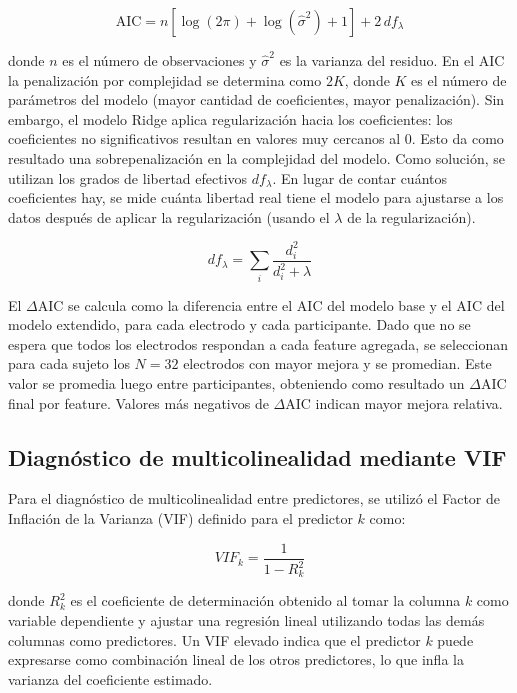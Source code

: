 \begin{equation}
    \label{eq:aic}
    \mathrm{AIC} = n\left[\log(2\pi) + \log(\hat{\sigma}^2) + 1\right] + 2\,df_\lambda
\end{equation}

donde $n$ es el número de observaciones y $\hat{\sigma}^2$ es la varianza del residuo. En el AIC la penalización por complejidad se determina como $2K$, donde $K$ es el número de parámetros del modelo (mayor cantidad de coeficientes, mayor penalización). Sin embargo, el modelo Ridge aplica regularización hacia los coeficientes: los coeficientes no significativos resultan en valores muy cercanos al 0. Esto da como resultado una sobrepenalización en la complejidad del modelo. Como solución, se utilizan los grados de libertad efectivos $df_{\lambda}$. En lugar de contar cuántos coeficientes hay, se mide cuánta libertad real tiene el modelo para ajustarse a los datos después de aplicar la regularización (usando el $\lambda$ de la regularización).

\begin{equation}
    \label{eq:df_lambda}
    df_{\lambda} = \sum_{i} \frac{d_i^2}{d_i^2 + \lambda}
\end{equation}

El $\Delta\mathrm{AIC}$ se calcula como la diferencia entre el AIC del modelo base y el AIC del modelo extendido, para cada electrodo y cada participante. Dado que no se espera que todos los electrodos respondan a cada feature agregada, se seleccionan para cada sujeto los $N = 32$ electrodos con mayor mejora y se promedian. Este valor se promedia luego entre participantes, obteniendo como resultado un $\Delta\mathrm{AIC}$ final por feature. Valores más negativos de $\Delta\mathrm{AIC}$ indican mayor mejora relativa.

\subsection{Diagnóstico de multicolinealidad mediante VIF}

Para el diagnóstico de multicolinealidad entre predictores, se utilizó el Factor de Inflación de la Varianza (VIF) definido para el predictor $k$ como:

\begin{equation}
    \label{eq:vif}
    VIF_{k} = \frac{1}{1-R_k^2}
\end{equation}

donde $R_k^2$ es el coeficiente de determinación obtenido al tomar la columna $k$ como variable dependiente y ajustar una regresión lineal utilizando todas las demás columnas como predictores. Un VIF elevado indica que el predictor $k$ puede expresarse como combinación lineal de los otros predictores, lo que infla la varianza del coeficiente estimado.

